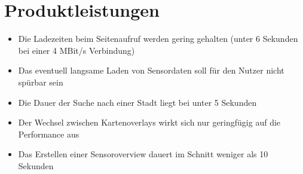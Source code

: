 \section{Produktleistungen}
\begin{itemize} [noitemsep]
    \item Die Ladezeiten beim Seitenaufruf werden gering gehalten (unter 6 Sekunden bei einer 4 MBit/s Verbindung)
    \item Das eventuell langsame Laden von \gls{Sensor}daten soll für den Nutzer nicht spürbar sein
    \item Die Dauer der Suche nach einer Stadt liegt bei unter 5 Sekunden
    \item Der Wechsel zwischen \glspl{Kartenoverlay} wirkt sich nur geringfügig auf die Performance aus
    \item Das Erstellen einer \gls{Sensoroverview} dauert im Schnitt weniger als 10 Sekunden
\end{itemize}